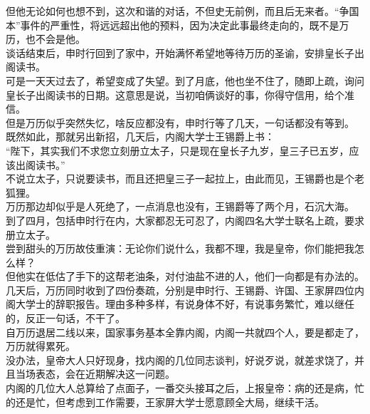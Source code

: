\begin{multicols}{\theparacolNo}
但他无论如何也想不到，这次和谐的对话，不但史无前例，而且后无来者。“争国本”事件的严重性，将远远超出他的预料，因为决定此事最终走向的，既不是万历，也不会是他。\\

谈话结束后，申时行回到了家中，开始满怀希望地等待万历的圣谕，安排皇长子出阁读书。\\

可是一天天过去了，希望变成了失望。到了月底，他也坐不住了，随即上疏，询问皇长子出阁读书的日期。这意思是说，当初咱俩谈好的事，你得守信用，给个准信。\\

但是万历似乎突然失忆，啥反应都没有，申时行等了几天，一句话都没有等到。\\

既然如此，那就另出新招，几天后，内阁大学士王锡爵上书：\\

“陛下，其实我们不求您立刻册立太子，只是现在皇长子九岁，皇三子已五岁，应该出阁读书。”\\

不说立太子，只说要读书，而且还把皇三子一起拉上，由此而见，王锡爵也是个老狐狸。\\

万历那边却似乎是人死绝了，一点消息也没有，王锡爵等了两个月，石沉大海。\\

到了四月，包括申时行在内，大家都忍无可忍了，内阁四名大学士联名上疏，要求册立太子。\\

尝到甜头的万历故伎重演：无论你们说什么，我都不理，我是皇帝，你们能把我怎么样？\\

但他实在低估了手下的这帮老油条，对付油盐不进的人，他们一向都是有办法的。\\

几天后，万历同时收到了四份奏疏，分别是申时行、王锡爵、许国、王家屏四位内阁大学士的辞职报告。理由多种多样，有说身体不好，有说事务繁忙，难以继任的，反正一句话，不干了。\\

自万历退居二线以来，国家事务基本全靠内阁，内阁一共就四个人，要是都走了，万历就得累死。\\

没办法，皇帝大人只好现身，找内阁的几位同志谈判，好说歹说，就差求饶了，并且当场表态，会在近期解决这一问题。\\

内阁的几位大人总算给了点面子，一番交头接耳之后，上报皇帝：病的还是病，忙的还是忙，但考虑到工作需要，王家屏大学士愿意顾全大局，继续干活。\\


\end{multicols}
